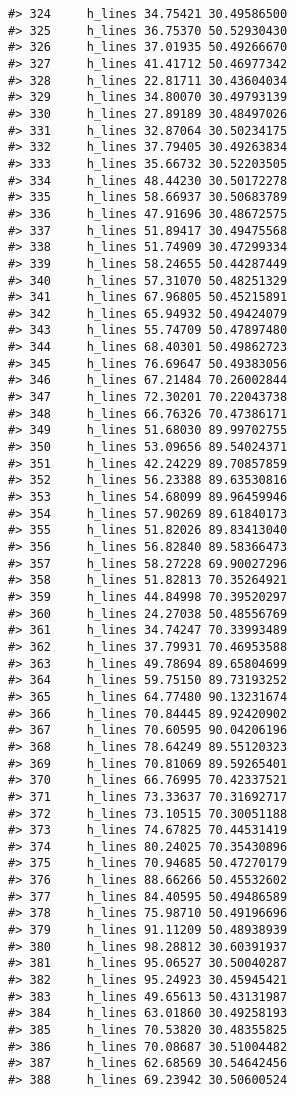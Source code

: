 \documentclass[
]{book}
\theoremstyle{definition}
\theoremstyle{definition}
\theoremstyle{definition}
\theoremstyle{definition}
\theoremstyle{remark}
\begin{document}
\begin{verbatim}
#> 324     h_lines 34.75421 30.49586500
#> 325     h_lines 36.75370 50.52930430
#> 326     h_lines 37.01935 50.49266670
#> 327     h_lines 41.41712 50.46977342
#> 328     h_lines 22.81711 30.43604034
#> 329     h_lines 34.80070 30.49793139
#> 330     h_lines 27.89189 30.48497026
#> 331     h_lines 32.87064 30.50234175
#> 332     h_lines 37.79405 30.49263834
#> 333     h_lines 35.66732 30.52203505
#> 334     h_lines 48.44230 30.50172278
#> 335     h_lines 58.66937 30.50683789
#> 336     h_lines 47.91696 30.48672575
#> 337     h_lines 51.89417 30.49475568
#> 338     h_lines 51.74909 30.47299334
#> 339     h_lines 58.24655 50.44287449
#> 340     h_lines 57.31070 50.48251329
#> 341     h_lines 67.96805 50.45215891
#> 342     h_lines 65.94932 50.49424079
#> 343     h_lines 55.74709 50.47897480
#> 344     h_lines 68.40301 50.49862723
#> 345     h_lines 76.69647 50.49383056
#> 346     h_lines 67.21484 70.26002844
#> 347     h_lines 72.30201 70.22043738
#> 348     h_lines 66.76326 70.47386171
#> 349     h_lines 51.68030 89.99702755
#> 350     h_lines 53.09656 89.54024371
#> 351     h_lines 42.24229 89.70857859
#> 352     h_lines 56.23388 89.63530816
#> 353     h_lines 54.68099 89.96459946
#> 354     h_lines 57.90269 89.61840173
#> 355     h_lines 51.82026 89.83413040
#> 356     h_lines 56.82840 89.58366473
#> 357     h_lines 58.27228 69.90027296
#> 358     h_lines 51.82813 70.35264921
#> 359     h_lines 44.84998 70.39520297
#> 360     h_lines 24.27038 50.48556769
#> 361     h_lines 34.74247 70.33993489
#> 362     h_lines 37.79931 70.46953588
#> 363     h_lines 49.78694 89.65804699
#> 364     h_lines 59.75150 89.73193252
#> 365     h_lines 64.77480 90.13231674
#> 366     h_lines 70.84445 89.92420902
#> 367     h_lines 70.60595 90.04206196
#> 368     h_lines 78.64249 89.55120323
#> 369     h_lines 70.81069 89.59265401
#> 370     h_lines 66.76995 70.42337521
#> 371     h_lines 73.33637 70.31692717
#> 372     h_lines 73.10515 70.30051188
#> 373     h_lines 74.67825 70.44531419
#> 374     h_lines 80.24025 70.35430896
#> 375     h_lines 70.94685 50.47270179
#> 376     h_lines 88.66266 50.45532602
#> 377     h_lines 84.40595 50.49486589
#> 378     h_lines 75.98710 50.49196696
#> 379     h_lines 91.11209 50.48938939
#> 380     h_lines 98.28812 30.60391937
#> 381     h_lines 95.06527 30.50040287
#> 382     h_lines 95.24923 30.45945421
#> 383     h_lines 49.65613 50.43131987
#> 384     h_lines 63.01860 30.49258193
#> 385     h_lines 70.53820 30.48355825
#> 386     h_lines 70.08687 30.51004482
#> 387     h_lines 62.68569 30.54642456
#> 388     h_lines 69.23942 30.50600524

\end{verbatim}
\end{document}
